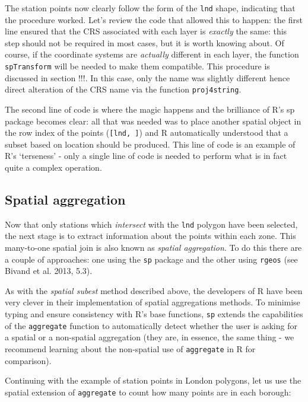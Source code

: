\documentclass[]{article}
\begin{document}
The station points now clearly follow the form of the \texttt{lnd}
shape, indicating that the procedure worked. Let's review the code that
allowed this to happen: the first line ensured that the CRS associated
with each layer is \emph{exactly} the same: this step should not be
required in most cases, but it is worth knowing about. Of course, if the
coordinate systems are \emph{actually} different in each layer, the
function \texttt{spTransform} will be needed to make them compatible.
This procedure is discussed in section !!!. In this case, only the name
was slightly different hence direct alteration of the CRS name via the
function \texttt{proj4string}.

The second line of code is where the magic happens and the brilliance of
R's sp package becomes clear: all that was needed was to place another
spatial object in the row index of the points (\texttt{{[}lnd, {]}}) and
R automatically understood that a subset based on location should be
produced. This line of code is an example of R's `terseness' - only a
single line of code is needed to perform what is in fact quite a complex
operation.

\subsection{Spatial aggregation}

Now that only stations which \emph{intersect} with the \texttt{lnd}
polygon have been selected, the next stage is to extract information
about the points within each zone. This many-to-one spatial join is also
known as \emph{spatial aggregation}. To do this there are a couple of
approaches: one using the \texttt{sp} package and the other using
\texttt{rgeos} (see Bivand et al. 2013, 5.3).

As with the \emph{spatial subest} method described above, the developers
of R have been very clever in their implementation of spatial
aggregations methods. To minimise typing and ensure consistency with R's
base functions, \texttt{sp} extends the capabilities of the
\texttt{aggregate} function to automatically detect whether the user is
asking for a spatial or a non-spatial aggregation (they are, in essence,
the same thing - we recommend learning about the non-spatial use of
\texttt{aggregate} in R for comparison).

Continuing with the example of station points in London polygons, let us
use the spatial extension of \texttt{aggregate} to count how many points
are in each borough:
\end{document}
